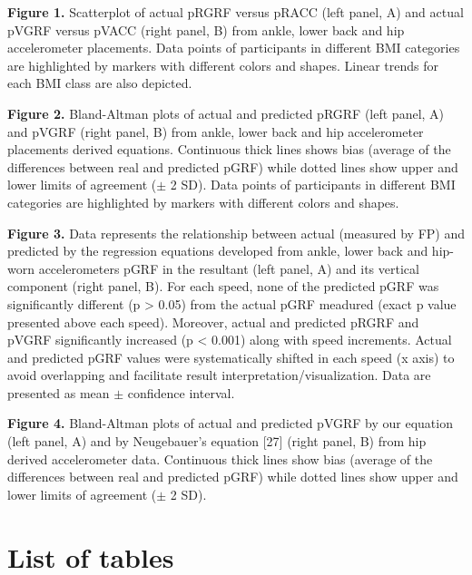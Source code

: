 \documentclass[12pt]{article}
\begin{document}
\noindent \textbf{Figure 1.} Scatterplot of actual pRGRF versus pRACC (left panel, A) and actual pVGRF versus pVACC (right panel, B) from ankle, lower back and hip accelerometer placements. Data points of participants in different BMI categories are highlighted by markers with different colors and shapes. Linear trends for each BMI class are also depicted. 
\vspace{0.3em}

\noindent \textbf{Figure 2.} Bland-Altman plots of actual and predicted pRGRF (left panel, A) and pVGRF (right panel, B) from ankle, lower back and hip accelerometer placements derived equations. Continuous thick lines shows bias (average of the differences between real and predicted pGRF) while dotted lines show upper and lower limits of agreement ($\pm$ 2 SD). Data points of participants in different BMI categories are highlighted by markers with different colors and shapes. 
\vspace{0.3em}

\noindent \textbf{Figure 3.} Data represents the relationship between actual (measured by FP) and predicted by the regression equations developed from ankle, lower back and hip-worn accelerometers pGRF in the resultant (left panel, A) and its vertical component (right panel, B). For each speed, none of the predicted pGRF was significantly different (p > 0.05) from the actual pGRF meadured (exact p value presented above each speed). Moreover, actual and predicted pRGRF and pVGRF significantly increased (p < 0.001) along with speed increments. Actual and predicted pGRF values were systematically shifted in each speed (x axis) to avoid overlapping and facilitate result interpretation/visualization. Data are presented as mean $\pm$ confidence interval. 
\vspace{0.3em}

\noindent \textbf{Figure 4.} Bland-Altman plots of actual and predicted pVGRF by our equation (left panel, A) and by Neugebauer’s equation [27] (right panel, B) from hip derived accelerometer data. Continuous thick lines show bias (average of the differences between real and predicted pGRF) while dotted lines show upper and lower limits of agreement ($\pm$ 2 SD). 

\pagebreak

\section*{\hfil List of tables \hfil}
\vspace{0.5em}
\end{document}

